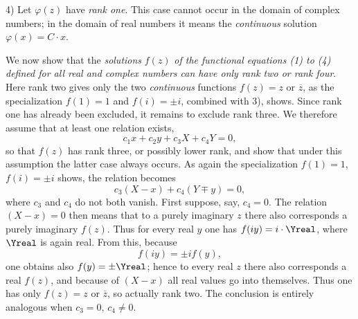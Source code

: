 4) Let \(\varphi(z)\) have \emph{rank one}. This case cannot occur in the domain of complex numbers; in the domain of real numbers it means the \emph{continuous} solution \(\varphi(x)=C\cdot x\).

We now show that the \emph{solutions} \(f(z)\) \emph{of the functional equations (1) to (4) defined for all real and complex numbers can have only rank two or rank four}. Here rank two gives only the two \emph{continuous} functions \(f(z)=z\) or \(\overline z\), as the specialization \(f(1)=1\) and \(f(i)=\pm i\), combined with 3), shows. Since rank one has already been excluded, it remains to exclude rank three. We therefore assume that at least one relation exists,
\[
c_1x+c_2y+c_3X+c_4Y=0,
\]
so that \(f(z)\) has rank three, or possibly lower rank, and show that under this assumption the latter case always occurs. As again the specialization \(f(1)=1\), \(f(i)=\pm i\) shows, the relation becomes
\[
c_3(X-x)+c_4(Y\mp y)=0,
\]
where \(c_3\) and \(c_4\) do not both vanish. First suppose, say, \(c_4=0\). The relation \((X-x)=0\) then means that to a purely imaginary \(z\) there also corresponds a purely imaginary \(f(z)\). Thus for every real \(y\) one has \(f(iy)=i\cdot\Yreal\), where \(\Yreal\) is again real. From this, because
\[
f(iy)=\pm i f(y),
\]
one obtains also \(f(y)=\pm\Yreal\); hence to every real \(z\) there also corresponds a real \(f(z)\), and because of \((X-x)\) all real values go into themselves. Thus one has only \(f(z)=z\) or \(\overline z\), so actually rank two. The conclusion is entirely analogous when \(c_3=0\), \(c_4\ne0\).

